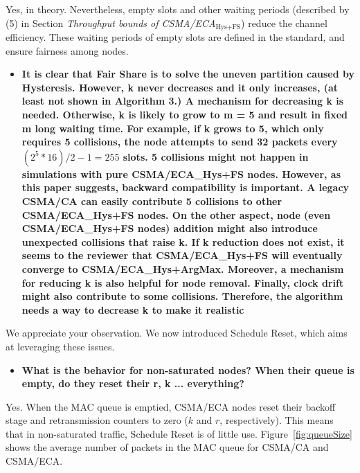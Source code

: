 \documentclass[]{article}
\begin{document}
		Yes, in theory. Nevertheless, empty slots and other waiting periods (described by (5) in Section \emph{Throughput bounds of CSMA/ECA$_{\text{Hys+FS}}$}) reduce the channel efficiency. These waiting periods of empty slots are defined in the standard, and ensure fairness among nodes.
		
		\begin{itemize}
			\item {\bfseries It is clear that Fair Share is to solve the uneven partition caused by Hysteresis. However, k never decreases and it only increases, (at least not shown in Algorithm 3.) A mechanism for decreasing k is needed. Otherwise, k is likely to grow to m = 5 and result in fixed m long waiting time. For example, if k grows to 5, which only requires 5 collisions, the node attempts to send 32 packets every $(2 ^ 5 * 16)/2 - 1 = 255$ slots. 5 collisions might not happen in simulations with pure CSMA/ECA\_{Hys+FS} nodes. However, as this paper suggests, backward compatibility is important. A legacy CSMA/CA can easily contribute 5 collisions to other CSMA/ECA\_{Hys+FS} nodes. On the other aspect, node (even CSMA/ECA\_{Hys+FS} nodes) addition might also introduce unexpected collisions that raise k. If k reduction does not exist, it seems to the reviewer that CSMA/ECA\_{Hys+FS} will eventually converge to CSMA/ECA\_{Hys+ArgMax}.  Moreover, a mechanism for reducing k is also helpful for node removal. Finally, clock drift might also contribute to some collisions. Therefore, the algorithm needs a way to decrease k to make it realistic}
		\end{itemize}
		
		We appreciate your observation. We now introduced Schedule Reset, which aims at leveraging these issues. 
		
		\begin{itemize}
			\item {\bfseries What is the behavior for non-saturated nodes? When their queue is empty, do they reset their r, k ... everything?}
		\end{itemize}
		
		Yes. When the MAC queue is emptied, CSMA/ECA nodes reset their backoff stage and retransmission counters to zero ($k$ and $r$, respectively). This means that in non-saturated traffic, Schedule Reset is of little use. Figure~\ref{fig:queueSize} shows the average number of packets in the MAC queue for CSMA/CA and CSMA/ECA.
		
\end{document}
